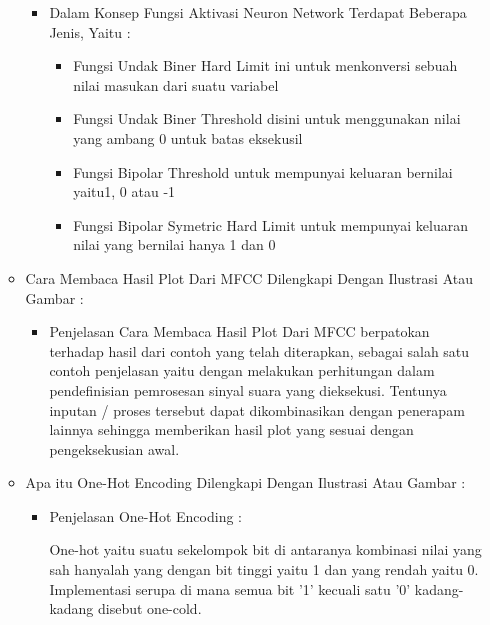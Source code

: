 \begin{enumerate}
\begin{itemize}
\begin{itemize}
\item Dalam Konsep Fungsi Aktivasi Neuron Network Terdapat Beberapa Jenis, Yaitu :
\begin{itemize}
\item Fungsi Undak Biner Hard Limit ini untuk menkonversi sebuah nilai masukan dari suatu variabel
\item Fungsi Undak Biner Threshold disini untuk menggunakan nilai yang ambang 0 untuk batas eksekusil
\item Fungsi Bipolar Threshold untuk mempunyai keluaran bernilai yaitu1, 0 atau -1 
\item Fungsi Bipolar  Symetric Hard Limit untuk mempunyai keluaran nilai yang  bernilai hanya 1 dan 0
\par
\par
\end{itemize}
\end{itemize}
\par
\par
\item Cara Membaca Hasil Plot Dari MFCC Dilengkapi Dengan Ilustrasi Atau Gambar :
\begin{itemize}
\item Penjelasan Cara Membaca Hasil Plot Dari MFCC berpatokan terhadap hasil dari contoh yang telah diterapkan, sebagai salah satu contoh penjelasan yaitu dengan melakukan perhitungan dalam pendefinisian pemrosesan sinyal suara yang dieksekusi. Tentunya inputan / proses tersebut dapat dikombinasikan dengan penerapam lainnya sehingga memberikan hasil plot yang sesuai dengan pengeksekusian awal.
\par
\par
\end{itemize}
\par
\par
\item Apa itu One-Hot Encoding Dilengkapi Dengan Ilustrasi Atau Gambar :
\begin{itemize}
\item Penjelasan One-Hot Encoding : 
\par  One-hot yaitu suatu sekelompok bit di antaranya kombinasi nilai yang sah hanyalah yang dengan bit tinggi yaitu 1 dan yang rendah yaitu 0. Implementasi serupa di mana semua bit '1' kecuali satu '0' kadang-kadang disebut one-cold.
\par
\par
\end{itemize}
\par
\par

\end{itemize}
\end{enumerate}
